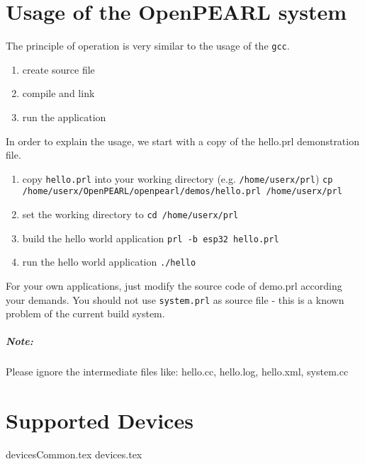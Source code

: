 \documentclass[oneside,10pt]{scrbook}
\begin{document}
\chapter{Usage of the OpenPEARL system}

The principle of operation is very similar to the usage of the \texttt{gcc}.

\begin{enumerate}
\item create source file
\item compile and link
\item run the application
\end{enumerate}

In order to explain the usage, we start with a copy of the hello.prl demonstration file.

\begin{enumerate}
\item copy \texttt{hello.prl} into your working directory (e.g. \texttt{/home/userx/prl}) \newline
   \texttt{cp /home/userx/OpenPEARL/openpearl/demos/hello.prl /home/userx/prl}
\item set the working directory to \newline
   \texttt{cd /home/userx/prl}
\item build the hello world application \newline
   \texttt{prl -b esp32 hello.prl}
\item run the hello world application \newline
   \texttt{./hello}
\end{enumerate}

For your own applications, just modify the source code of demo.prl according your demands.
You should not use \texttt{system.prl} as source file - this is a known problem of the current
build system.


\paragraph{Note:}
Please ignore the intermediate files like:
hello.cc, hello.log, hello.xml, system.cc



\chapter{Supported Devices}
{devicesCommon.tex}
{devices.tex}
\end{document}
